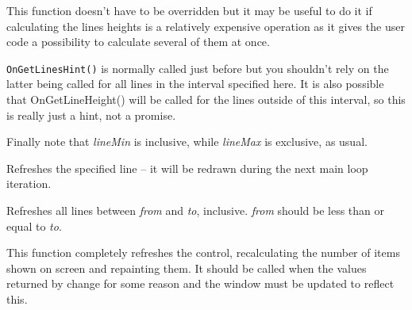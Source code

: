 \label{wxvscrolledwindowongetlineshint}


This function doesn't have to be overridden but it may be useful to do
it if calculating the lines heights is a relatively expensive operation
as it gives the user code a possibility to calculate several of them at
once.

{\tt OnGetLinesHint()} is normally called just before 
 but you
shouldn't rely on the latter being called for all lines in the interval
specified here. It is also possible that OnGetLineHeight() will be
called for the lines outside of this interval, so this is really just a
hint, not a promise.

Finally note that {\it lineMin} is inclusive, while {\it lineMax} is exclusive,
as usual.


\label{wxvscrolledwindowrefreshline}


Refreshes the specified line -- it will be redrawn during the next main loop
iteration.




\label{wxvscrolledwindowrefreshlines}


Refreshes all lines between {\it from} and {\it to}, inclusive. {\it from}
should be less than or equal to {\it to}.




\label{wxvscrolledwindowrefreshall}


This function completely refreshes the control, recalculating the number of
items shown on screen and repainting them. It should be called when the values
returned by  change
for some reason and the window must be updated to reflect this.


